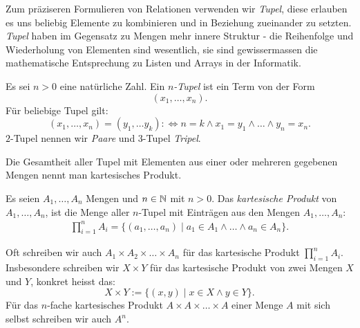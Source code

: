 Zum präziseren Formulieren von Relationen verwenden wir \textit{Tupel}, diese erlauben es uns beliebig Elemente zu kombinieren und in Beziehung zueinander zu setzten. \textit{Tupel} haben im Gegensatz zu Mengen mehr innere Struktur - die Reihenfolge und Wiederholung von Elementen sind wesentlich, sie sind gewissermassen die mathematische Entsprechung zu Listen und Arrays in der Informatik.

\begin{df}[Tupel]
Es sei $n>0$ eine natürliche Zahl. Ein $n$\textit{-Tupel} ist ein Term von der Form
\[
(x_1,\dots,x_n).
\]
Für beliebige Tupel gilt:
\[
(x_1,\dots,x_n)=(y_1,\dots y_k):\Leftrightarrow n=k\land x_1=y_1\land\dots\land y_n=x_n.
\]
$2$-Tupel nennen wir \textit{Paare} und $3$-Tupel \textit{Tripel}.
\end{df}

Die Gesamtheit aller Tupel mit Elementen aus einer oder mehreren gegebenen Mengen nennt man kartesisches Produkt.

\begin{df}\label{df:kartesischesProdukt}
Es seien $A_1,\dots, A_n$ Mengen und $n\in\mathbb{N}$ mit $n>0$.
Das \textit{kartesische Produkt} von $A_1,\dots, A_n$, ist die Menge aller $n$-Tupel mit Einträgen aus den Mengen $A_1,\dots ,A_n$:
\begin{align*}
\prod_{i=1}^{n}A_i=\big\{(a_1,\dots,a_n)\mid a_1\in A_1\land\dots\land a_n\in A_n \big\}.
\end{align*}
\end{df}

\begin{rk}
    Oft schreiben wir auch $A_1\times A_2\times \dots\times A_n$ für das kartesische Produkt $\prod_{i=1}^nA_i$. Insbesondere schreiben wir $X\times Y$ für das kartesische Produkt von zwei Mengen $X$ und $Y$, konkret heisst das:
    \[
    X\times Y:=\{(x,y)\mid x\in X\land y\in Y \}.
    \]
    Für das $n$-fache kartesisches Produkt $A\times A\times\dots\times A$ einer Menge $A$ mit sich selbst schreiben wir auch $A^n$.
    \end{rk}

